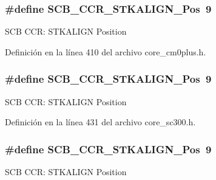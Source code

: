 \subsubsection[{\texorpdfstring{S\+C\+B\+\_\+\+C\+C\+R\+\_\+\+S\+T\+K\+A\+L\+I\+G\+N\+\_\+\+Pos}{SCB_CCR_STKALIGN_Pos}}]{\setlength{\rightskip}{0pt plus 5cm}\#define S\+C\+B\+\_\+\+C\+C\+R\+\_\+\+S\+T\+K\+A\+L\+I\+G\+N\+\_\+\+Pos~9}\hypertarget{group___c_m_s_i_s___s_c_b_gac2d20a250960a432cc74da59d20e2f86}{}\label{group___c_m_s_i_s___s_c_b_gac2d20a250960a432cc74da59d20e2f86}
S\+CB C\+CR\+: S\+T\+K\+A\+L\+I\+GN Position 

Definición en la línea 410 del archivo core\+\_\+cm0plus.\+h.

\subsubsection[{\texorpdfstring{S\+C\+B\+\_\+\+C\+C\+R\+\_\+\+S\+T\+K\+A\+L\+I\+G\+N\+\_\+\+Pos}{SCB_CCR_STKALIGN_Pos}}]{\setlength{\rightskip}{0pt plus 5cm}\#define S\+C\+B\+\_\+\+C\+C\+R\+\_\+\+S\+T\+K\+A\+L\+I\+G\+N\+\_\+\+Pos~9}\hypertarget{group___c_m_s_i_s___s_c_b_gac2d20a250960a432cc74da59d20e2f86}{}\label{group___c_m_s_i_s___s_c_b_gac2d20a250960a432cc74da59d20e2f86}
S\+CB C\+CR\+: S\+T\+K\+A\+L\+I\+GN Position 

Definición en la línea 431 del archivo core\+\_\+sc300.\+h.

\subsubsection[{\texorpdfstring{S\+C\+B\+\_\+\+C\+C\+R\+\_\+\+S\+T\+K\+A\+L\+I\+G\+N\+\_\+\+Pos}{SCB_CCR_STKALIGN_Pos}}]{\setlength{\rightskip}{0pt plus 5cm}\#define S\+C\+B\+\_\+\+C\+C\+R\+\_\+\+S\+T\+K\+A\+L\+I\+G\+N\+\_\+\+Pos~9}\hypertarget{group___c_m_s_i_s___s_c_b_gac2d20a250960a432cc74da59d20e2f86}{}\label{group___c_m_s_i_s___s_c_b_gac2d20a250960a432cc74da59d20e2f86}
S\+CB C\+CR\+: S\+T\+K\+A\+L\+I\+GN Position 

